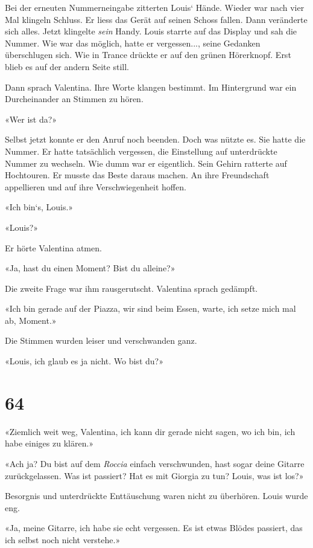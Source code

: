 Bei der erneuten Nummerneingabe zitterten Louis` Hände. Wieder war nach
vier Mal klingeln Schluss. Er liess das Gerät auf seinen Schoss fallen.
Dann veränderte sich alles. Jetzt klingelte \emph{sein} Handy. Louis
starrte auf das Display und sah die Nummer. Wie war das möglich, hatte
er vergessen..., seine Gedanken überschlugen sich. Wie in Trance drückte
er auf den grünen Hörerknopf. Erst blieb es auf der andern Seite still.

Dann sprach Valentina. Ihre Worte klangen bestimmt. Im Hintergrund war
ein Durcheinander an Stimmen zu hören.

«Wer ist da?»

Selbst jetzt konnte er den Anruf noch beenden. Doch was nützte es. Sie
hatte die Nummer. Er hatte tatsächlich vergessen, die Einstellung auf
unterdrückte Nummer zu wechseln. Wie dumm war er eigentlich. Sein Gehirn
ratterte auf Hochtouren. Er musste das Beste daraus machen. An ihre
Freundschaft appellieren und auf ihre Verschwiegenheit hoffen.

«Ich bin`s, Louis.»

«Louis?»

Er hörte Valentina atmen.

«Ja, hast du einen Moment? Bist du alleine?»

Die zweite Frage war ihm rausgerutscht. Valentina sprach gedämpft.

«Ich bin gerade auf der Piazza, wir sind beim Essen, warte, ich setze
mich mal ab, Moment.»

Die Stimmen wurden leiser und verschwanden ganz.

«Louis, ich glaub es ja nicht. Wo bist du?»

\chapter{64}\label{section-64}

«Ziemlich weit weg, Valentina, ich kann dir gerade nicht sagen, wo ich
bin, ich habe einiges zu klären.»

«Ach ja? Du bist auf dem \emph{Roccia} einfach verschwunden, hast sogar
deine Gitarre zurückgelassen. Was ist passiert? Hat es mit Giorgia zu
tun? Louis, was ist los?»

Besorgnis und unterdrückte Enttäuschung waren nicht zu überhören. Louis
wurde eng.

«Ja, meine Gitarre, ich habe sie echt vergessen. Es ist etwas Blödes
passiert, das ich selbst noch nicht verstehe.»

